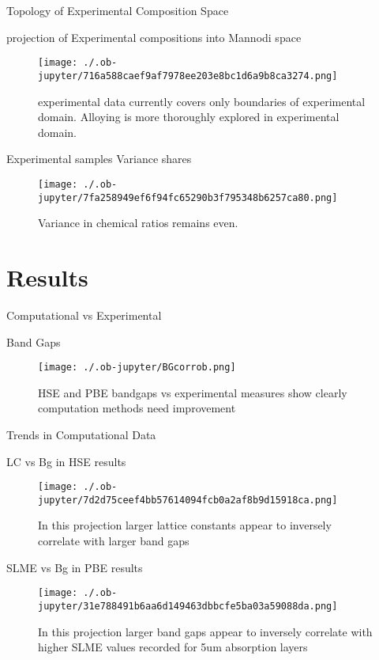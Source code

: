 \documentclass[9pt, compress]{beamer}
\begin{document}
\begin{frame}[allowframebreaks]{Topology of Experimental Composition Space}
\begin{block}{projection of Experimental compositions into Mannodi space}
\begin{figure}[htbp]
\centering
\texttt{[image: ./.ob-jupyter/716a588caef9af7978ee203e8bc1d6a9b8ca3274.png]}
\caption{experimental data currently covers only boundaries of experimental domain. Alloying is more thoroughly explored in experimental domain.}
\end{figure}
\end{block}
\begin{block}{Experimental samples Variance shares}
\begin{figure}[htbp]
\centering
\texttt{[image: ./.ob-jupyter/7fa258949ef6f94fc65290b3f795348b6257ca80.png]}
\caption{Variance in chemical ratios remains even.}
\end{figure}
\end{block}
\end{frame}
\section{Results}
\label{sec:orgc210d14}
\begin{frame}[allowframebreaks]{Computational vs Experimental}
\begin{block}{Band Gaps}
\begin{figure}[htbp]
\centering
\texttt{[image: ./.ob-jupyter/BGcorrob.png]}
\caption{\label{fig:bg_corr} HSE and PBE bandgaps vs experimental measures show clearly computation methods need improvement}
\end{figure}
\end{block}
\end{frame}
\begin{frame}[allowframebreaks]{Trends in Computational Data}
\begin{block}{LC vs Bg in HSE results}
\begin{figure}[htbp]
\centering
\texttt{[image: ./.ob-jupyter/7d2d75ceef4bb57614094fcb0a2af8b9d15918ca.png]}
\caption{\label{fig:HSE_clust} In this projection larger lattice constants appear to inversely correlate with larger band gaps}
\end{figure}
\end{block}
\begin{block}{SLME vs Bg in PBE results}
\begin{figure}[htbp]
\centering
\texttt{[image: ./.ob-jupyter/31e788491b6aa6d149463dbbcfe5ba03a59088da.png]}
\caption{\label{fig:PBE_clust} In this projection larger band gaps appear to inversely correlate with higher SLME values recorded for 5um absorption layers}
\end{figure}
\end{block}
\end{frame}
\end{document}

